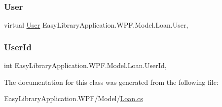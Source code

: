 \subsubsection{\texorpdfstring{User}{User}}
{\footnotesize\ttfamily virtual \mbox{\hyperlink{class_easy_library_application_1_1_w_p_f_1_1_model_1_1_user}{User}} Easy\+Library\+Application.\+W\+P\+F.\+Model.\+Loan.\+User\hspace{0.3cm}{\ttfamily [get]}, {\ttfamily [set]}}

\mbox{\label{class_easy_library_application_1_1_w_p_f_1_1_model_1_1_loan_a32462dde2df259f6764681c9defca084}} 
\subsubsection{\texorpdfstring{User\+Id}{UserId}}
{\footnotesize\ttfamily int Easy\+Library\+Application.\+W\+P\+F.\+Model.\+Loan.\+User\+Id\hspace{0.3cm}{\ttfamily [get]}, {\ttfamily [set]}}



The documentation for this class was generated from the following file\+:\begin{DoxyCompactItemize}
\item 
Easy\+Library\+Application.\+W\+P\+F/\+Model/\mbox{\hyperlink{_loan_8cs}{Loan.\+cs}}\end{DoxyCompactItemize}
